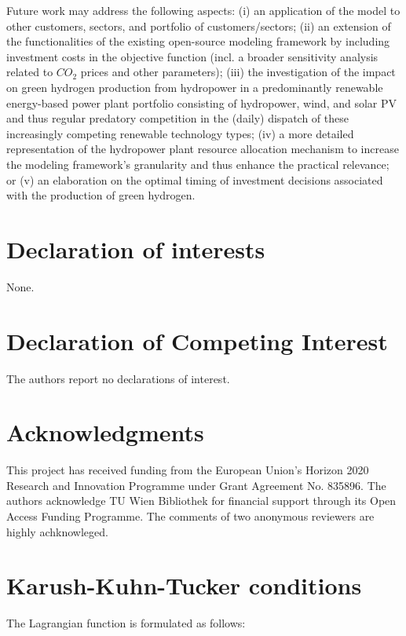 \documentclass[review]{elsarticle}
\begin{document}
Future work may address the following aspects: (i) an application of the model to other customers, sectors, and portfolio of customers/sectors; (ii) an extension of the functionalities of the existing open-source modeling framework by including investment costs in the objective function (incl. a broader sensitivity analysis related to $CO_2$ prices and other parameters); (iii) the investigation of the impact on green hydrogen production from hydropower in a predominantly renewable energy-based power plant portfolio consisting of hydropower, wind, and solar PV and thus regular predatory competition in the (daily) dispatch of these increasingly competing renewable technology types; (iv) a more detailed representation of the hydropower plant resource allocation mechanism to increase the modeling framework's granularity and thus enhance the practical relevance; or (v) an elaboration on the optimal timing of investment decisions associated with the production of green hydrogen.

\section*{Declaration of interests}
None.
\section*{Declaration of Competing Interest}
The authors report no declarations of interest.
\section*{Acknowledgments}
This project has received funding from the European Union's Horizon 2020 Research and Innovation Programme under Grant Agreement No. 835896. The authors acknowledge TU Wien Bibliothek for financial support through its Open Access Funding Programme. The comments of two anonymous reviewers are highly achknowleged.


\appendix
\setcounter{table}{0}
\setcounter{figure}{0}

\section{Karush-Kuhn-Tucker conditions}\label{AppendixA}

The Lagrangian function is formulated as follows:
\end{document}
